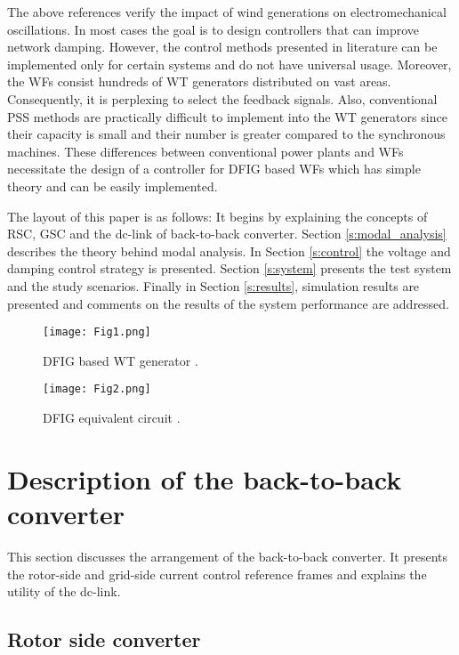 \documentclass[conference,11pt]{IEEEtran}
\begin{document}
The above references verify the impact of wind generations on electromechanical oscillations. In most cases the goal is to design controllers that can improve network damping. However, the control methods presented in literature can be implemented only for certain systems and do not have universal usage. Moreover, the WFs consist hundreds of WT generators distributed on vast areas. Consequently, it is perplexing to select the feedback signals. Also, conventional PSS methods are practically difficult to implement into the WT generators since their capacity is small and their number is greater compared to the synchronous machines. These differences between conventional power plants and WFs necessitate the design of a controller for DFIG based WFs which has simple theory and can be easily implemented.

The layout of this paper is as follows: It begins by explaining the concepts of RSC, GSC and the dc-link of back-to-back converter. Section \ref{s:modal_analysis} describes the theory behind modal analysis. In Section \ref{s:control} the voltage and damping control strategy is presented. Section \ref{s:system} presents the test system and the study scenarios. Finally in Section \ref{s:results}, simulation results are presented and comments on the results of the system performance are addressed.

\begin{figure}[t]
  \centering
  \texttt{[image: Fig1.png]}
  \caption{DFIG based WT generator \cite{ref2}.}
  \label{f:fig1_label}
\end{figure} 

\begin{figure}[t]
  \centering
  \texttt{[image: Fig2.png]}
  \caption{DFIG equivalent circuit \cite{ref1}.}
  \label{f:fig2_label}
\end{figure} 

\section{Description of the back-to-back converter}\label{s:back_converter}
This section discusses the arrangement of the back-to-back converter. It presents the rotor-side and grid-side current control reference frames and explains the utility of the dc-link.

\subsection{Rotor side converter}
\end{document}
